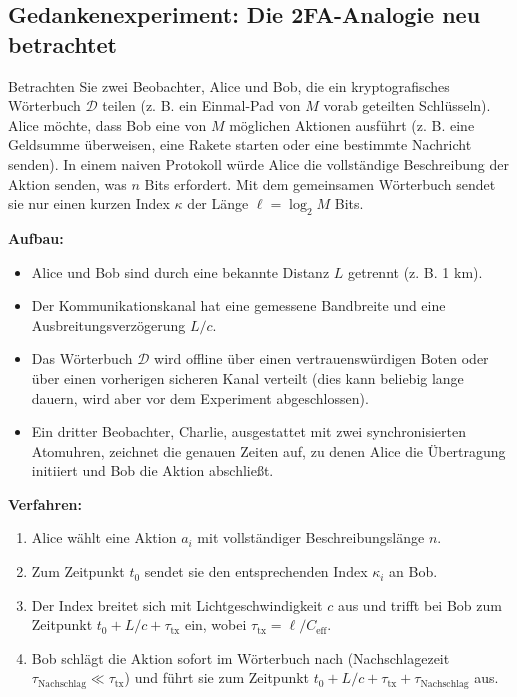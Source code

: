 \documentclass[12pt]{article}
\begin{document}
	\subsection{Gedankenexperiment: Die 2FA-Analogie neu betrachtet}
	\label{subsec:thought-2fa}
	
	Betrachten Sie zwei Beobachter, Alice und Bob, die ein kryptografisches Wörterbuch \( \mathcal{D} \) teilen (z. B. ein Einmal-Pad von \(M\) vorab geteilten Schlüsseln). Alice möchte, dass Bob eine von \(M\) möglichen Aktionen ausführt (z. B. eine Geldsumme überweisen, eine Rakete starten oder eine bestimmte Nachricht senden). In einem naiven Protokoll würde Alice die vollständige Beschreibung der Aktion senden, was \(n\) Bits erfordert. Mit dem gemeinsamen Wörterbuch sendet sie nur einen kurzen Index \(\kappa\) der Länge \(\ell = \log_2 M\) Bits.
	
	\textbf{Aufbau:}
	\begin{itemize}
		\item Alice und Bob sind durch eine bekannte Distanz \(L\) getrennt (z. B. 1 km).
		\item Der Kommunikationskanal hat eine gemessene Bandbreite und eine Ausbreitungsverzögerung \(L/c\).
		\item Das Wörterbuch \(\mathcal{D}\) wird offline über einen vertrauenswürdigen Boten oder über einen vorherigen sicheren Kanal verteilt (dies kann beliebig lange dauern, wird aber vor dem Experiment abgeschlossen).
		\item Ein dritter Beobachter, Charlie, ausgestattet mit zwei synchronisierten Atomuhren, zeichnet die genauen Zeiten auf, zu denen Alice die Übertragung initiiert und Bob die Aktion abschließt.
	\end{itemize}
	
	\textbf{Verfahren:}
	\begin{enumerate}
		\item Alice wählt eine Aktion \(a_i\) mit vollständiger Beschreibungslänge \(n\).
		\item Zum Zeitpunkt \(t_0\) sendet sie den entsprechenden Index \(\kappa_i\) an Bob.
		\item Der Index breitet sich mit Lichtgeschwindigkeit \(c\) aus und trifft bei Bob zum Zeitpunkt \(t_0 + L/c + \tau_{\text{tx}}\) ein, wobei \(\tau_{\text{tx}} = \ell / C_{\text{eff}}\).
		\item Bob schlägt die Aktion sofort im Wörterbuch nach (Nachschlagezeit \(\tau_{\text{Nachschlag}} \ll \tau_{\text{tx}}\)) und führt sie zum Zeitpunkt \(t_0 + L/c + \tau_{\text{tx}} + \tau_{\text{Nachschlag}}\) aus.
	\end{enumerate}
	
\end{document}
